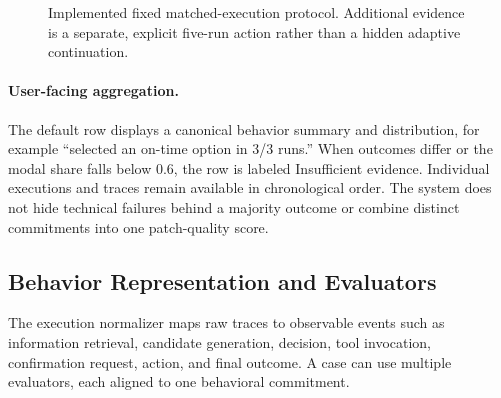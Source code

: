 \begin{figure}[t]
    \centering
    \caption{Implemented fixed matched-execution protocol. Additional evidence is a separate, explicit five-run action rather than a hidden adaptive continuation.}
    \label{fig:fixed-review}
\end{figure}

\paragraph{User-facing aggregation.}
The default row displays a canonical behavior summary and distribution, for example ``selected an on-time option in 3/3 runs.'' When outcomes differ or the modal share falls below 0.6, the row is labeled Insufficient evidence. Individual executions and traces remain available in chronological order. The system does not hide technical failures behind a majority outcome or combine distinct commitments into one patch-quality score.

\subsection{Behavior Representation and Evaluators}
\label{app:evaluators}

The execution normalizer maps raw traces to observable events such as information retrieval, candidate generation, decision, tool invocation, confirmation request, action, and final outcome. A case can use multiple evaluators, each aligned to one behavioral commitment.

